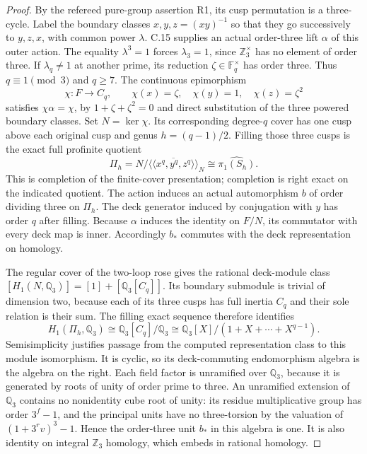 \begin{proof}
By the refereed pure-group assertion R1, its cusp
permutation is a three-cycle.  Label the boundary
classes $x,y,z=(xy)^{-1}$ so that they go successively
to $y,z,x$, with common power $\lambda$.  C.15 supplies
an actual order-three lift $\alpha$ of this outer action.
The equality $\lambda^3=1$ forces $\lambda_3=1$,
since $\mathbb Z_3^{\times}$ has no element of order
three.  If $\lambda_q\ne1$ at another prime, its
reduction $\zeta\in\mathbb F_q^{\times}$ has order
three.  Thus $q\equiv1\pmod3$ and $q\geq7$.
The continuous epimorphism
\[
 \chi:F\longrightarrow C_q,\qquad
 \chi(x)=\zeta,\quad\chi(y)=1,\quad\chi(z)=\zeta^2
                                                               \tag{C.16.1}
\]
satisfies $\chi\alpha=\chi$, by
$1+\zeta+\zeta^2=0$ and direct substitution of the
three powered boundary classes.  Set $N=\ker\chi$.
Its corresponding degree-$q$ cover has one cusp above
each original cusp and genus $h=(q-1)/2$.
Filling those three cusps is the exact full profinite
quotient
\[
 \Pi_h=N/
 \overline{\langle\!\langle x^q,y^q,z^q\rangle\!\rangle}_N
       \cong\widehat{\pi_1(S_h)}.
                                                               \tag{C.16.2}
\]
This is completion of the finite-cover presentation;
completion is right exact on the indicated quotient.
The action induces an actual automorphism $b$ of order
dividing three on $\Pi_h$.  The deck generator induced
by conjugation with $y$ has order $q$ after filling.
Because $\alpha$ induces the identity on $F/N$, its
commutator with every deck map is inner.  Accordingly
$b_*$ commutes with the deck representation on homology.

The regular cover of the two-loop rose gives the rational
deck-module class $[H_1(N,\mathbb Q_3)]=[1]+[\mathbb Q_3[C_q]]$.
Its boundary submodule is trivial of dimension two,
because each of its three cusps has full inertia $C_q$
and their sole relation is their sum.  The filling exact
sequence therefore identifies
\[
 H_1(\Pi_h,\mathbb Q_3)
       \cong\mathbb Q_3[C_q]/\mathbb Q_3
       \cong\mathbb Q_3[X]/(1+X+\cdots+X^{q-1}).
                                                               \tag{C.16.3}
\]
Semisimplicity justifies passage from the computed
representation class to this module isomorphism.  It
is cyclic, so its deck-commuting endomorphism algebra
is the algebra on the right.  Each field factor is
unramified over $\mathbb Q_3$, because it is generated
by roots of unity of order prime to three.  An
unramified extension of $\mathbb Q_3$ contains no
nonidentity cube root of unity: its residue multiplicative
group has order $3^f-1$, and the principal units have
no three-torsion by the valuation of $(1+3^rv)^3-1$.
Hence the order-three unit $b_*$ in this algebra is
one.  It is also identity on integral $\mathbb Z_3$
homology, which embeds in rational homology.


\end{proof}
